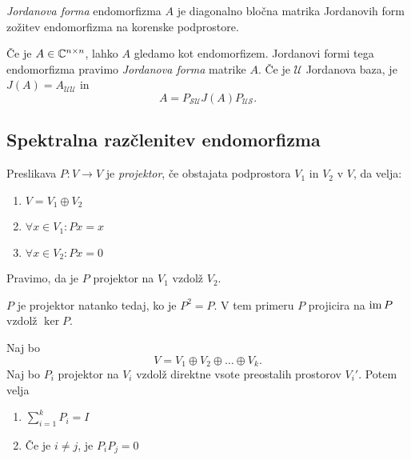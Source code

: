 \documentclass[12pt, a4paper]{article}
\begin{document}
\begin{definicija}
\emph{Jordanova forma} endomorfizma $A$ je diagonalno bločna matrika Jordanovih form zožitev endomorfizma na korenske podprostore.
\end{definicija}

\begin{opomba}
Če je $A\in\mathbb{C}^{n\times n}$, lahko $A$ gledamo kot endomorfizem. Jordanovi formi tega endomorfizma pravimo \emph{Jordanova forma} matrike $A$. Če je $\mathcal{U}$ Jordanova baza, je $J(A)=A_{\mathcal{UU}}$ in
\[
A=P_{\mathcal{SU}}J(A)P_{\mathcal{US}}.
\]
\end{opomba}

\newpage

\subsection{Spektralna razčlenitev endomorfizma}

\begin{definicija}
Preslikava $P\colon V\to V$ je \emph{projektor}, če obstajata podprostora $V_1$ in $V_2$ v $V$, da velja:

\begin{enumerate}[label=\roman*)]
\item $V=V_1\oplus V_2$
\item $\forall x\in V_1\colon Px=x$
\item $\forall x\in V_2\colon Px=0$
\end{enumerate}

Pravimo, da je $P$ projektor na $V_1$ vzdolž $V_2$.
\end{definicija}

\begin{trditev}
$P$ je projektor natanko tedaj, ko je $P^2=P$. V tem primeru $P$ projicira na $\operatorname{im} P$ vzdolž $\ker P$.
\end{trditev}

\obvs

\begin{trditev}
Naj bo
\[
V=V_1\oplus V_2\oplus\dots\oplus V_k.
\]
Naj bo $P_i$ projektor na $V_i$ vzdolž direktne vsote preostalih prostorov $V_i'$. Potem velja

\begin{enumerate}[label=\roman*)]
\item $\displaystyle\sum_{i=1}^k P_i=I$
\item Če je $i\ne j$, je $P_iP_j=0$
\end{enumerate}
\end{trditev}
\end{document}
